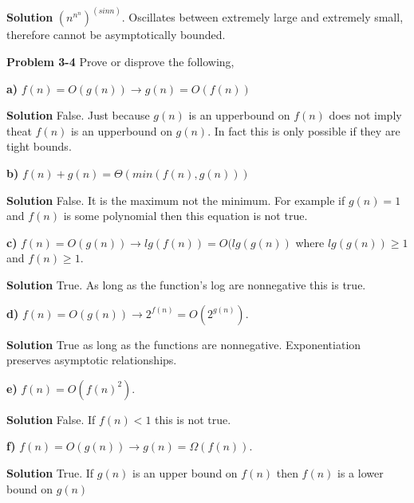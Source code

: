\documentclass{article}
\begin{document}
\medskip

\textbf{Solution} $(n^{n^n})^(sin n)$. Oscillates between extremely large and extremely small, therefore cannot be asymptotically bounded.

\medskip

\hrulefill

\textbf{Problem 3-4} Prove or disprove the following,

\medskip

\textbf{a)} $f(n) = O(g(n)) \rightarrow g(n) = O(f(n))$

\medskip

\textbf{Solution} False. Just because $g(n)$ is an upperbound on $f(n)$ does not imply theat $f(n)$ is an upperbound on $g(n)$. In fact this is only possible if they are tight bounds.

\medskip

\textbf{b)} $f(n) + g(n) = \Theta(min(f(n),g(n)))$

\medskip

\textbf{Solution} False. It is the maximum not the minimum. For example if $g(n) = 1$ and $f(n)$ is some polynomial then this equation is not true.

\medskip

\textbf{c)} $f(n) = O(g(n)) \rightarrow lg(f(n)) = O(lg(g(n))$ where $lg(g(n)) \geq 1$ and $f(n) \geq 1$.

\medskip

\textbf{Solution} True. As long as the function's log are nonnegative this is true.

\medskip

\textbf{d)} $f(n) = O(g(n)) \rightarrow 2^{f(n)} = O(2^{g(n)})$.

\medskip

\textbf{Solution} True as long as the functions are nonnegative. Exponentiation preserves asymptotic relationships.

\medskip

\textbf{e)} $f(n) = O(f(n)^2)$.

\medskip

\textbf{Solution} False. If $f(n) < 1$ this is not true.

\medskip

\textbf{f)} $f(n) = O(g(n)) \rightarrow g(n) = \Omega(f(n))$.

\medskip

\textbf{Solution} True. If $g(n)$ is an upper bound on $f(n)$ then $f(n)$ is a lower bound on $g(n)$

\medskip
\end{document}
